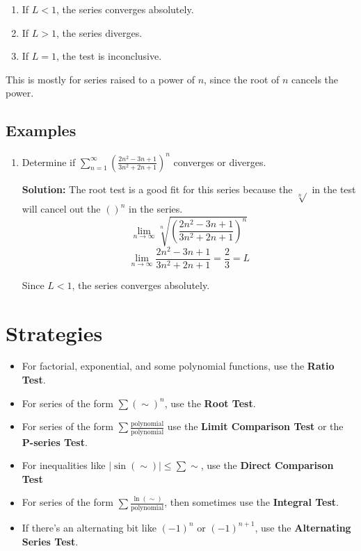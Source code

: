 \documentclass[12pt]{report}
\begin{document}
\begin{enumerate}
	\item If $ L < 1 $, the series converges absolutely.
	\item If $ L > 1 $, the series diverges.
	\item If $ L = 1 $, the test is inconclusive. 
\end{enumerate}

\noindent This is mostly for series raised to a power of $n$, since the root of $n$ cancels the power.


\subsection*{Examples}
\begin{enumerate}
	\item Determine if $\sum_{n=1}^{\infty} \left( \frac{2n^2-3n+1}{3n^2+2n+1} \right)^n$ converges or diverges.
	
	\textbf{Solution:} The root test is a good fit for this series because the $\sqrt[n]{}$ in the test will cancel out the $()^n$ in the series.
		$$ \lim_{n\to\infty} \sqrt[n]{\left( \frac{2n^2-3n+1}{3n^2+2n+1} \right)^n} $$
		$$ \lim_{n\to\infty} \frac{2n^2-3n+1}{3n^2+2n+1} = \frac{2}{3} = L $$
		
	Since $ L < 1 $, the series converges absolutely. 
\end{enumerate}


\pagebreak


\section{Strategies}

\begin{itemize}
	
	\item[] For factorial, exponential, and some polynomial functions, use the \textbf{Ratio Test}.

	\item[] For series of the form $ \sum \left( \sim \right)^n $, use the \textbf{Root Test}.

	\item[] For series of the form $ \sum \frac{\text{polynomial}}{\text{polynomial}} $ use the \textbf{Limit Comparison Test} or the \textbf{P-series Test}.

	\item[] For inequalities like $ \left| \sin(\sim) \right| \leq \sum \sim $, use the \textbf{Direct Comparison Test}

	\item[] For series of the form $ \sum \frac{\ln(\sim)}{\text{polynomial}} $, then sometimes use the \textbf{Integral Test}.
	
	\item[] If there's an alternating bit like $ (-1)^n $ or $ (-1)^{n+1} $, use the \textbf{Alternating Series Test}.
\end{itemize}


\pagebreak
\end{document}
